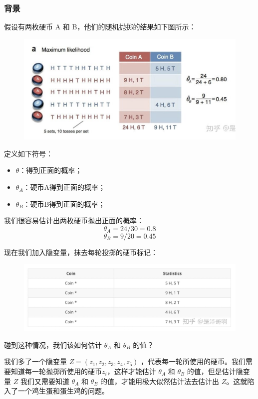 \documentclass[12pt]{article}
\begin{document}
\subsubsection{背景}
假设有两枚硬币 A 和 B，他们的随机抛掷的结果如下图所示：
\begin{figure}[H]
    \centering
    \includegraphics[width=.8\textwidth]{fig/EM_Detailed_Example_A_1.png}
\end{figure}
定义如下符号：
\begin{itemize}
\setlength{\itemsep}{0pt}
\setlength{\parsep}{0pt}
\setlength{\parskip}{0pt}
    \item $\theta$：得到正面的概率；
    \item $\theta_A$：硬币A得到正面的概率；
    \item $\theta_B$：硬币B得到正面的概率；
\end{itemize}

我们很容易估计出两枚硬币抛出正面的概率：
$$
\theta_A = 24/30 = 0.8
$$
$$
\theta_B = 9/20 = 0.45
$$

现在我们加入隐变量，抹去每轮投掷的硬币标记：
\begin{figure}[H]
    \centering
    \includegraphics[width=.8\textwidth]{fig/EM_Detailed_Example_A_2.png}
\end{figure}

碰到这种情况，我们该如何估计 $\theta_A$ 和 $\theta_B$ 的值？

我们多了一个隐变量 $Z = (z_1, z_2, z_3, z_4, z_5)$ ，代表每一轮所使用的硬币。我们需要知道每一轮抛掷所使用的硬币$z_i$，这样才能估计 $\theta_A$ 和 $\theta_B$ 的值，但是估计隐变量 $Z$ 我们又需要知道  $\theta_A$  和 $\theta_B$ 的值，才能用极大似然估计法去估计出 $Z$。这就陷入了一个鸡生蛋和蛋生鸡的问题。
\end{document}
